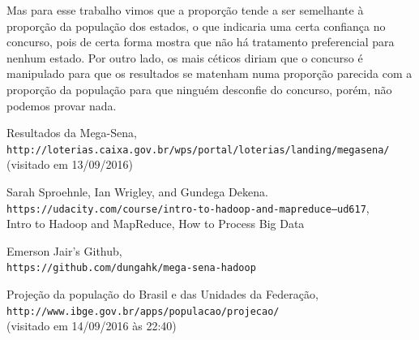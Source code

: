 \documentclass[a4paper,10pt]{article}
\begin{document}
Mas para esse trabalho vimos que a proporção tende a ser semelhante à proporção da população dos estados, o que indicaria uma certa confiança no concurso, pois de certa forma mostra que não há tratamento preferencial para nenhum estado. Por outro lado, os mais céticos diriam que o concurso é manipulado para que os resultados se matenham numa proporção parecida com a proporção da população para que ninguém desconfie do concurso, porém, não podemos provar nada.


\begin{thebibliography}{9}
 Resultados da Mega-Sena,\\
\texttt{http://loterias.caixa.gov.br/wps/portal/loterias/landing/megasena/}\\
(visitado em 13/09/2016)

 Sarah Sproehnle, Ian Wrigley, and Gundega Dekena.\\
\texttt{https://udacity.com/course/intro-to-hadoop-and-mapreduce--ud617},\\
Intro to Hadoop and MapReduce, How to Process Big Data

 Emerson Jair's Github,\\
\texttt{https://github.com/dungahk/mega-sena-hadoop}

 Projeção da população do Brasil e das Unidades da Federação,\\
\texttt{http://www.ibge.gov.br/apps/populacao/projecao/}\\
(visitado em 14/09/2016 às 22:40)

\end{thebibliography}
\end{document}
